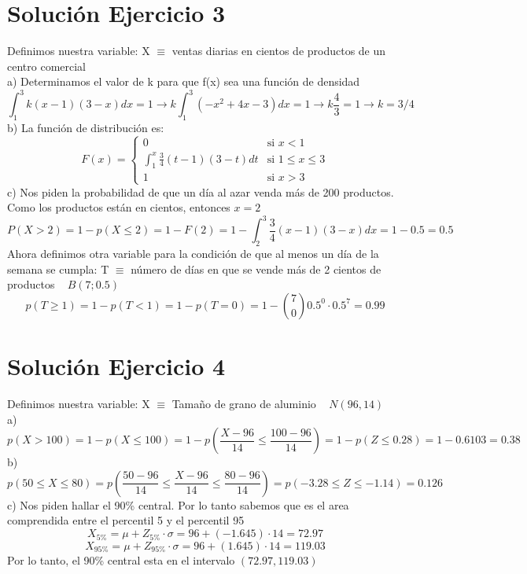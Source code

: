 \documentclass[fleqn]{article}
\begin{document}
	\section{Solución Ejercicio 3}
	Definimos nuestra variable: X $\equiv$ ventas diarias en cientos de productos de un centro comercial \\
	a) Determinamos el valor de k para que f(x) sea una función de densidad
	\[
	\int_{1}^{3} k(x-1)(3-x)dx = 1 \rightarrow k\int_{1}^{3} (-x^2 +4x -3)dx = 1 \rightarrow k\frac{4}{3} = 1 \rightarrow \boxed{k = 3/4}
	\]
	b) La función de distribución es:
	\[
	F(x) = 
	\begin{cases}
		0 & \text{si } x < 1 \\
		\int_{1}^{x}\frac{3}{4}(t - 1)(3 - t) dt & \text{si } 1 \leq x \leq 3 \\
		1 & \text{si } x > 3
	\end{cases}
	\]
	c) Nos piden la probabilidad de que un día al azar venda más de 200 productos. Como los productos están en cientos, entonces $x = 2$
	\[
	P(X > 2) = 1 - p(X \leq 2) = 1 - F(2) = 1 - \int_{2}^{3}\frac{3}{4}(x - 1)(3 - x) dx = 1 - 0.5 = 0.5 
	\]
	Ahora definimos otra variable para la condición de que al menos un día de la semana se cumpla: T $\equiv$ número de días en que se vende más de 2 cientos de productos ~ $B(7;0.5)$
	\[
	p(T \geq 1) = 1 - p(T < 1) = 1 - p(T = 0) = 1 - \binom{7}{0} 0.5^0 \cdot 0.5^7 = \boxed{0.99}
	\]
	\section{Solución Ejercicio 4}
	Definimos nuestra variable: X $\equiv$ Tamaño de grano de aluminio ~ $N(96,14)$ \\
	a)
	\[
	p(X > 100) = 1 - p(X \leq 100) = 1 - p(\frac{X-96}{14} \leq \frac{100-96}{14}) = 1 - p(Z \leq 0.28) = 1 - 0.6103 = \boxed{0.38}
	\]
	b)
	\[
	p(50 \leq X \leq 80) = p(\frac{50-96}{14} \leq \frac{X-96}{14} \leq \frac{80-96}{14}) = p(-3.28 \leq Z \leq -1.14) = \boxed{0.126} 
	\]
	c) Nos piden hallar el 90\% central. Por lo tanto sabemos que es el area comprendida entre el percentil 5 y el percentil 95
	\[
	X_{5\%} = \mu + Z_{5\%} \cdot \sigma = 96 + (-1.645) \cdot 14 = 72.97
	\]
	\[
	X_{95\%} = \mu + Z_{95\%} \cdot \sigma = 96 + (1.645) \cdot 14 = 119.03
	\]
	Por lo tanto, el 90\% central esta en el intervalo $(72.97, 119.03)$
\end{document}
